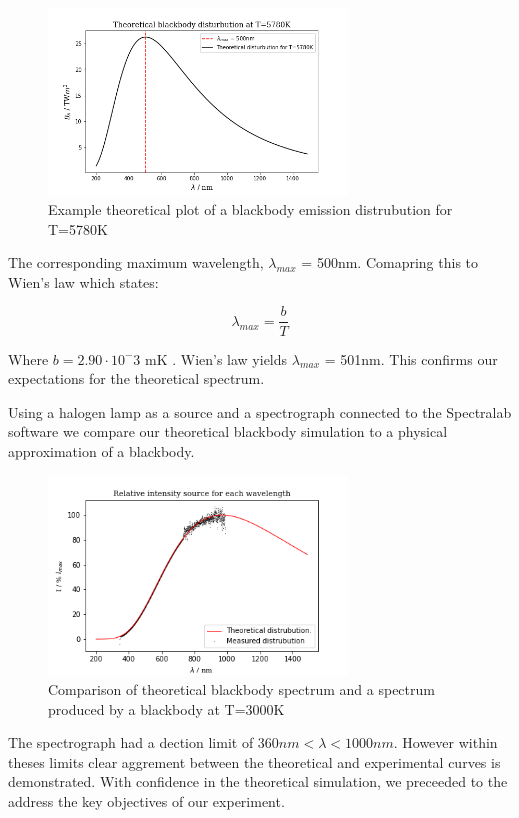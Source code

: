 \documentclass{article}%
\begin{document}
\begin{figure}[H]%
\centering%
\includegraphics[width=300px]{task1_fig_a.png}%
\caption{Example theoretical plot of a blackbody emission distrubution for T=5780K}%
\end{figure}


The corresponding maximum wavelength, $\lambda_{max}$ = 500nm. Comapring this to Wien's law which states: 

\begin{equation}
   \lambda_{max} = \frac{b}{T}
\end{equation}



Where $b=2.90 \cdot 10^-3$ mK . Wien's law yields $\lambda_{max}$ = 501nm. 
This confirms our expectations for the theoretical spectrum. 


Using a halogen lamp as a source and a spectrograph connected to the Spectralab software we compare our theoretical blackbody simulation
to a physical approximation of a blackbody. 

\begin{figure}[H]%
\centering%
\includegraphics[width=300px]{task3_fig_a.png}%
\caption{Comparison of theoretical blackbody spectrum and a spectrum produced by a blackbody at T=3000K}%
\end{figure}


The spectrograph had a dection limit of $360nm < \lambda < 1000nm$. However within theses limits clear aggrement between the theoretical and experimental curves is demonstrated.
With confidence in the theoretical simulation, we preceeded to the address the key objectives of our experiment.
\end{document}
